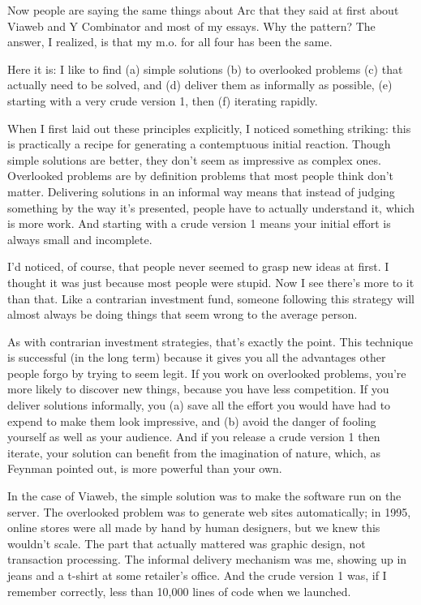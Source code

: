 Now people are saying the same things about Arc that they said at first
about Viaweb and Y Combinator and most of my essays. Why the pattern?
The answer, I realized, is that my m.o. for all four has been the same.

Here it is: I like to find (a) simple solutions (b) to overlooked
problems (c) that actually need to be solved, and (d) deliver them as
informally as possible, (e) starting with a very crude version 1, then
(f) iterating rapidly.

When I first laid out these principles explicitly, I noticed something
striking: this is practically a recipe for generating a contemptuous
initial reaction. Though simple solutions are better, they don't seem as
impressive as complex ones. Overlooked problems are by definition
problems that most people think don't matter. Delivering solutions in an
informal way means that instead of judging something by the way it's
presented, people have to actually understand it, which is more work.
And starting with a crude version 1 means your initial effort is always
small and incomplete.

I'd noticed, of course, that people never seemed to grasp new ideas at
first. I thought it was just because most people were stupid. Now I see
there's more to it than that. Like a contrarian investment fund, someone
following this strategy will almost always be doing things that seem
wrong to the average person.

As with contrarian investment strategies, that's exactly the point. This
technique is successful (in the long term) because it gives you all the
advantages other people forgo by trying to seem legit. If you work on
overlooked problems, you're more likely to discover new things, because
you have less competition. If you deliver solutions informally, you (a)
save all the effort you would have had to expend to make them look
impressive, and (b) avoid the danger of fooling yourself as well as your
audience. And if you release a crude version 1 then iterate, your
solution can benefit from the imagination of nature, which, as Feynman
pointed out, is more powerful than your own.

In the case of Viaweb, the simple solution was to make the software run
on the server. The overlooked problem was to generate web sites
automatically; in 1995, online stores were all made by hand by human
designers, but we knew this wouldn't scale. The part that actually
mattered was graphic design, not transaction processing. The informal
delivery mechanism was me, showing up in jeans and a t-shirt at some
retailer's office. And the crude version 1 was, if I remember correctly,
less than 10,000 lines of code when we launched.

